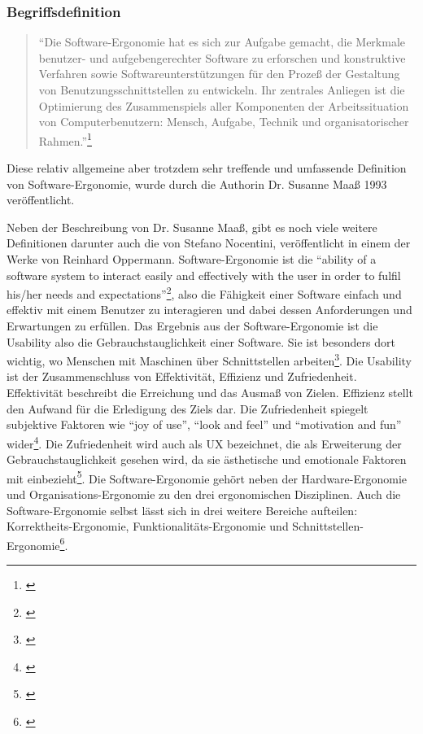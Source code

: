 \subsubsection{Begriffsdefinition}
\begin{quote}
    \enquote{Die Software-Ergonomie hat es sich zur Aufgabe gemacht, die Merkmale benutzer- und aufgebengerechter Software zu erforschen und konstruktive Verfahren sowie Softwareunterstützungen für den Prozeß der Gestaltung von Benutzungsschnittstellen zu entwickeln. Ihr zentrales Anliegen ist die Optimierung des Zusammenspiels aller Komponenten der Arbeitssituation von Computerbenutzern: Mensch, Aufgabe, Technik und organisatorischer Rahmen.}\footnote{\cite[191]{Maass1993}}
\end{quote}
Diese relativ allgemeine aber trotzdem sehr treffende und umfassende Definition von Software-Ergonomie, wurde durch die Authorin Dr. Susanne Maaß 1993 veröffentlicht. 

Neben der Beschreibung von Dr. Susanne Maaß, gibt es noch viele weitere Definitionen darunter auch die von Stefano Nocentini, veröffentlicht in einem der Werke von Reinhard Oppermann. Software-Ergonomie ist die \enquote{ability of a software system to interact easily and effectively with the user in order to fulfil his/her needs and expectations}\footnote{\cite[4]{Oppermann1988einfuehrung}}, also die Fähigkeit einer Software einfach und effektiv mit einem Benutzer zu interagieren und dabei dessen Anforderungen und Erwartungen zu erfüllen. Das Ergebnis aus der Software-Ergonomie ist die Usability also die Gebrauchstauglichkeit einer Software. Sie ist besonders dort wichtig, wo Menschen mit Maschinen über Schnittstellen arbeiten\footnote{\cite[vgl.][]{usabilityDe}}. Die Usability ist der Zusammenschluss von Effektivität, Effizienz und Zufriedenheit. Effektivität beschreibt die Erreichung und das Ausmaß von Zielen. Effizienz stellt den Aufwand für die Erledigung des Ziels dar. Die Zufriedenheit spiegelt subjektive Faktoren wie \enquote{joy of use}, \enquote{look and feel} und \enquote{motivation and fun} wider\footnote{\cite[vgl.][]{Holzinger2011human}}. Die Zufriedenheit wird auch als \gls{UX} bezeichnet, die als Erweiterung der Gebrauchstauglichkeit gesehen wird, da sie ästhetische und emotionale Faktoren mit einbezieht\footnote{\cite[vgl.][]{usabilityDe}}. Die Software-Ergonomie gehört neben der Hardware-Ergonomie und Organisations-Ergonomie zu den drei ergonomischen Disziplinen. Auch die Software-Ergonomie selbst lässt sich in drei weitere Bereiche aufteilen: Korrektheits-Ergonomie, Funktionalitäts-Ergonomie und Schnittstellen-Ergonomie\footnote{\cite[vgl.][]{Oppermann1988einfuehrung}}.

